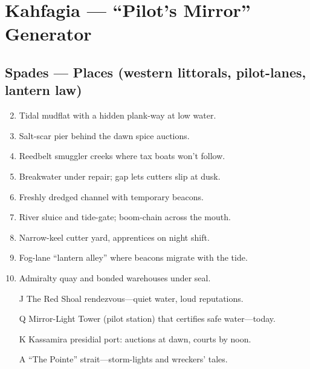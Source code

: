 \chapter{Kahfagia --- ``Pilot's Mirror'' Generator}
\label{chap:kahfagia}

\section*{Spades --- Places (western littorals, pilot-lanes, lantern law)}
\label{sec:kahfagia-places}
\begin{enumerate}
\setcounter{enumi}{1}
\item Tidal mudflat with a hidden plank-way at low water.
\item Salt-scar pier behind the dawn spice auctions.
\item Reedbelt smuggler creeks where tax boats won't follow.
\item Breakwater under repair; gap lets cutters slip at dusk.
\item Freshly dredged channel with temporary beacons.
\item River sluice and tide-gate; boom-chain across the mouth.
\item Narrow-keel cutter yard, apprentices on night shift.
\item Fog-lane ``lantern alley'' where beacons migrate with the tide.
\item Admiralty quay and bonded warehouses under seal.
\item[J] The Red Shoal rendezvous---quiet water, loud reputations.
\item[Q] Mirror-Light Tower (pilot station) that certifies safe water---today.
\item[K] Kassamira presidial port: auctions at dawn, courts by noon.
\item[A] ``The Pointe'' strait---storm-lights and wreckers' tales.
\end{enumerate}

